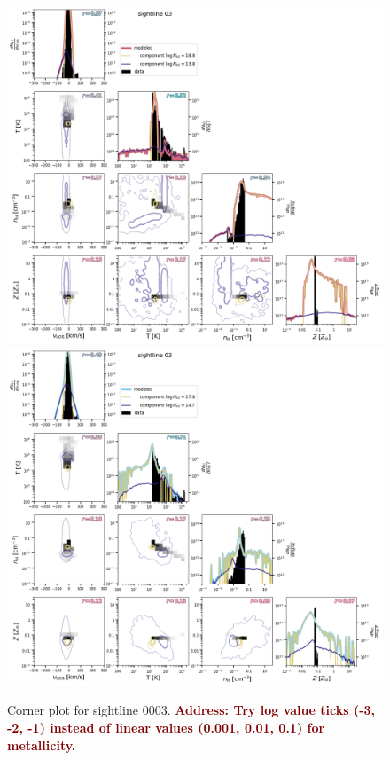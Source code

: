 \documentclass[fleqn,usenatbib]{mnras}
\newcommand{\todo}[1]{\textcolor{Maroon}{\textbf{Address: #1}}}
\begin{document}
\begin{figure}
    \centering
    \includegraphics[height=0.45\textheight]{figures/sample2/original/sightline_0003.png}
    \includegraphics[height=0.45\textheight]{figures/sample2/high-z/sightline_0003.png}
    \caption{Corner plot for sightline 0003.
    \todo{Try log value ticks (-3, -2, -1) instead of linear values (0.001, 0.01, 0.1) for metallicity.}}
    \label{f: sample2 03}
\end{figure}
\end{document}
